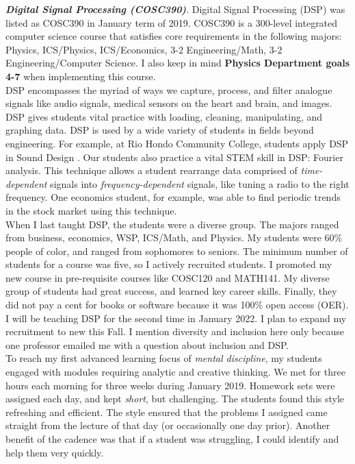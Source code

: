 \documentclass[../../../main.tex]{subfiles}
\begin{document}
\textbf{\textit{Digital Signal Processing (COSC390)}}.  Digital Signal Processing (DSP) was listed as COSC390 in January term of 2019.  COSC390 is a 300-level integrated computer science course that satisfies core requirements in the following majors: Physics, ICS/Physics, ICS/Economics, 3-2 Engineering/Math, 3-2 Engineering/Computer Science.  I also keep in mind \textbf{Physics Department goals 4-7} when implementing this course.
\\
\vspace{0.15cm}
DSP encompasses the myriad of ways we capture, process, and filter analogue signals like audio signals, medical sensors on the heart and brain, and images.  DSP gives students vital practice with loading, cleaning, manipulating, and graphing data.  DSP is used by a wide variety of students in fields beyond engineering.  For example, at Rio Hondo Community College, students apply DSP in Sound Design \cite{rio_hondo}.  Our students also practice a vital STEM skill in DSP: Fourier analysis.  This technique allows a student rearrange data comprised of \textit{time-dependent} signals into \textit{frequency-dependent} signals, like tuning a radio to the right frequency.  One economics student, for example, was able to find periodic trends in the stock market using this technique.
\\
\vspace{0.15cm}
When I last taught DSP, the students were a diverse group.  The majors ranged from business, economics, WSP, ICS/Math, and Physics.  My students were 60\% people of color, and ranged from sophomores to seniors.  The minimum number of students for a course was five, so I actively recruited students.  I promoted my new course in pre-requisite courses like COSC120 and MATH141.  My diverse group of students had great success, and learned key career skills.  Finally, they did not pay a cent for books or software because it was 100\% open access (OER).  I will be teaching DSP for the second time in January 2022.  I plan to expand my recruitment to new this Fall.  I mention diversity and inclusion here only because one professor emailed me with a question about inclusion and DSP. 
\\
\vspace{0.15cm}
To reach my first advanced learning focus of \textit{mental discipline}, my students engaged with modules requiring analytic and creative thinking.  We met for three hours each morning for three weeks during January 2019.  Homework sets were assigned each day, and kept \textit{short}, but challenging.  The students found this style refreshing and efficient.  The style ensured that the problems I assigned came straight from the lecture of that day (or occasionally one day prior).  Another benefit of the cadence was that if a student was struggling, I could identify and help them very quickly.
\end{document}
